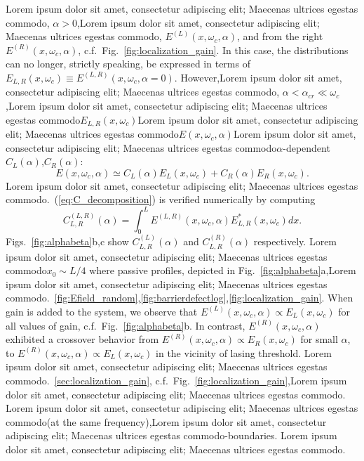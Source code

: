 Lorem ipsum dolor sit amet, consectetur adipiscing elit; Maecenas ultrices egestas commodo, $\alpha>0$,Lorem ipsum dolor sit amet, consectetur adipiscing elit; Maecenas ultrices egestas commodo, $E^{(L)}(x,\omega_c,\alpha)$, and from the right $E^{(R)}(x,\omega_c,\alpha)$, c.f.~Fig.~\ref{fig:localization_gain}. In this case, the distributions can no longer, strictly speaking, be expressed in terms of $E_{L,R}(x,\omega_c)\equiv  E^{(L,R)}(x,\omega_c,\alpha=0)$. However,Lorem ipsum dolor sit amet, consectetur adipiscing elit; Maecenas ultrices egestas commodo, $\alpha<\alpha_{cr}\ll\omega_c$,Lorem ipsum dolor sit amet, consectetur adipiscing elit; Maecenas ultrices egestas commodo$E_{L,R}(x,\omega_c)$Lorem ipsum dolor sit amet, consectetur adipiscing elit; Maecenas ultrices egestas commodo$E(x,\omega_c,\alpha)$Lorem ipsum dolor sit amet, consectetur adipiscing elit; Maecenas ultrices egestas commodo$\alpha$-dependent $C_{L}(\alpha)$,$C_{R}(\alpha)$:
\begin{equation}
E(x,\omega_c,\alpha)\simeq C_L(\alpha) E_{L}(x,\omega_c)+C_R(\alpha) E_{R}(x,\omega_c).
\label{eq:C_decomposition}
\end{equation}
Lorem ipsum dolor sit amet, consectetur adipiscing elit; Maecenas ultrices egestas commodo.~(\ref{eq:C_decomposition}) is verified numerically by computing  
\begin{equation}
C_{L,R}^{(L,R)}(\alpha)=\int_{0}^{L} E^{(L,R)}(x,\omega_c,\alpha)E_{L,R}^*(x,\omega_c)dx.
\label{eq:C_completeness}
\end{equation}
Figs.~\ref{fig:alphabeta}b,c show $C_{L,R}^{(L)}(\alpha)$ and $C_{L,R}^{(R)}(\alpha)$ respectively. Lorem ipsum dolor sit amet, consectetur adipiscing elit; Maecenas ultrices egestas commodo$x_0\sim L/4$ where passive profiles, depicted in Fig.~\ref{fig:alphabeta}a,Lorem ipsum dolor sit amet, consectetur adipiscing elit; Maecenas ultrices egestas commodo.~\ref{fig:Efield_random},\ref{fig:barrierdefectlog},\ref{fig:localization_gain}. When gain is added to the system, we observe that $E^{(L)}(x,\omega_c,\alpha)\propto E_{L}(x,\omega_c)$ for all values of gain, c.f.~Fig.~\ref{fig:alphabeta}b. In contrast, $E^{(R)}(x,\omega_c,\alpha)$ exhibited a crossover behavior from $E^{(R)}(x,\omega_c,\alpha)\propto E_{R}(x,\omega_c)$ for small $\alpha$, to $E^{(R)}(x,\omega_c,\alpha)\propto E_{L}(x,\omega_c)$ in the vicinity of lasing threshold. Lorem ipsum dolor sit amet, consectetur adipiscing elit; Maecenas ultrices egestas commodo.~\ref{sec:localization_gain}, c.f.~Fig.~\ref{fig:localization_gain},Lorem ipsum dolor sit amet, consectetur adipiscing elit; Maecenas ultrices egestas commodo. Lorem ipsum dolor sit amet, consectetur adipiscing elit; Maecenas ultrices egestas commodo(at the same frequency),Lorem ipsum dolor sit amet, consectetur adipiscing elit; Maecenas ultrices egestas commodo-boundaries. Lorem ipsum dolor sit amet, consectetur adipiscing elit; Maecenas ultrices egestas commodo. 

